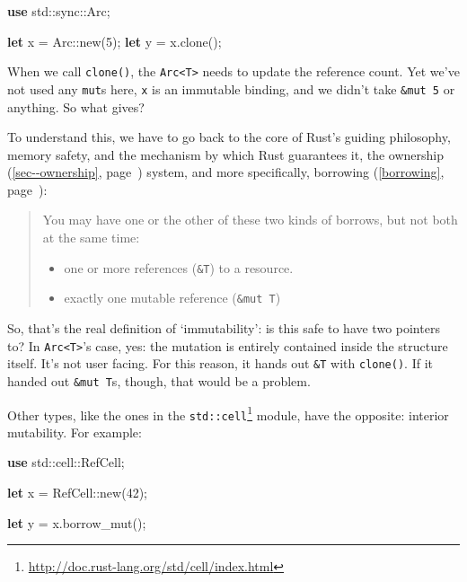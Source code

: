 \documentclass[a4paper,]{book}
\renewcommand*{\hyperref}[2][\ar]{%
  \def\ar{#2}%
  #2 (\autoref{#1}, page~\pageref{#1})}
\newenvironment{Shaded}{\begin{snugshade}}{\end{snugshade}}
\newcommand{\KeywordTok}[1]{\textcolor[rgb]{0.13,0.29,0.53}{\textbf{{#1}}}}
\newcommand{\DecValTok}[1]{\textcolor[rgb]{0.00,0.00,0.81}{{#1}}}
\newcommand{\NormalTok}[1]{{#1}}
\renewcommand{\href}[2]{#2\footnote{\url{#1}}}
\providecommand{\tightlist}{%
  \setlength{\itemsep}{0pt}\setlength{\parskip}{0pt}}
\begin{document}
\begin{Shaded}
\begin{Highlighting}[]
\KeywordTok{use} \NormalTok{std::sync::Arc;}

\KeywordTok{let} \NormalTok{x = Arc::new(}\DecValTok{5}\NormalTok{);}
\KeywordTok{let} \NormalTok{y = x.clone();}
\end{Highlighting}
\end{Shaded}

When we call \texttt{clone()}, the
\texttt{Arc\textless{}T\textgreater{}} needs to update the reference
count. Yet we've not used any \texttt{mut}s here, \texttt{x} is an
immutable binding, and we didn't take \texttt{\&mut\ 5} or anything. So
what gives?

To understand this, we have to go back to the core of Rust's guiding
philosophy, memory safety, and the mechanism by which Rust guarantees
it, the \hyperref[sec--ownership]{ownership} system, and more
specifically, \hyperref[borrowing]{borrowing}:

\begin{quote}
You may have one or the other of these two kinds of borrows, but not
both at the same time:

\begin{itemize}
\tightlist
\item
  one or more references (\texttt{\&T}) to a resource.
\item
  exactly one mutable reference (\texttt{\&mut\ T})
\end{itemize}
\end{quote}

So, that's the real definition of `immutability': is this safe to have
two pointers to? In \texttt{Arc\textless{}T\textgreater{}}'s case, yes:
the mutation is entirely contained inside the structure itself. It's not
user facing. For this reason, it hands out \texttt{\&T} with
\texttt{clone()}. If it handed out \texttt{\&mut\ T}s, though, that
would be a problem.

Other types, like the ones in the
\href{http://doc.rust-lang.org/std/cell/index.html}{\texttt{std::cell}}
module, have the opposite: interior mutability. For example:

\begin{Shaded}
\begin{Highlighting}[]
\KeywordTok{use} \NormalTok{std::cell::RefCell;}

\KeywordTok{let} \NormalTok{x = RefCell::new(}\DecValTok{42}\NormalTok{);}

\KeywordTok{let} \NormalTok{y = x.borrow_mut();}
\end{Highlighting}
\end{Shaded}
\end{document}
